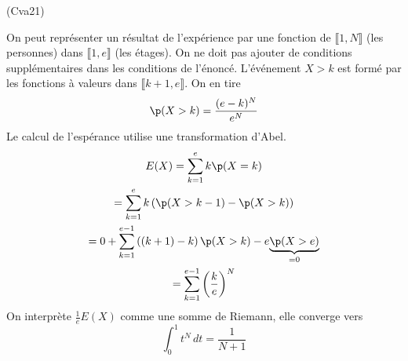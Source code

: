 \begin{tiny}(Cva21)\end{tiny} On peut représenter un résultat de l'expérience par une fonction de $\llbracket 1,N\rrbracket$ (les personnes) dans $\llbracket 1,e\rrbracket$ (les étages). On ne doit pas ajouter de conditions supplémentaires dans les conditions de l'énoncé.\newline
L'événement $X>k$ est formé par les fonctions à valeurs dans $\llbracket k+1, e\rrbracket$. On en tire
\begin{displaymath}
  \p(X>k)= \frac{(e-k)^N}{e^N}
\end{displaymath}
Le calcul de l'espérance utilise une transformation d'Abel.
\begin{multline*}
E(X) = \sum_{k=1}^ek\p(X=k)\\
= \sum_{k=1}^e k\left( \p(X>k-1) - \p(X>k)\right) \\
= 0 + \sum_{k=1}^{e-1} \left((k+1)  - k\right) \p(X>k) -e\underset{=0}{\underbrace{\p(X>e)}}\\
= \sum_{k=1}^{e-1}\left(\frac{k}{e} \right)^N 
\end{multline*}
On interprète $\frac{1}{e}E(X)$ comme une somme de Riemann, elle converge vers
\begin{displaymath}
  \int_0^1 t^N\,dt = \frac{1}{N+1}
\end{displaymath}
